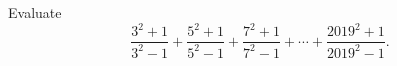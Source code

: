 Evaluate
\[
\dfrac{3^2+1}{3^2-1}+\dfrac{5^2+1}{5^2-1}+\dfrac{7^2+1}{7^2-1}+\cdots+\dfrac{2019^2+1}{2019^2-1}.
\]
